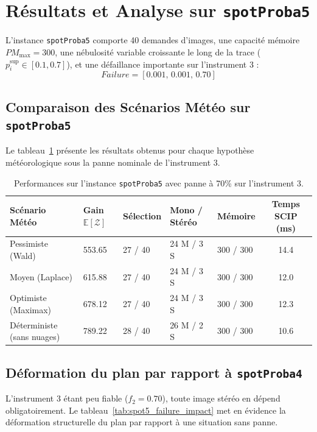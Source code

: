 \section{Résultats et Analyse sur \texttt{spotProba5}}

L'instance \texttt{spotProba5} comporte 40 demandes d'images, une capacité mémoire $PM_{\max} = 300$, une nébulosité variable croissante le long de la trace ($p_i^{\sup} \in [0.1, 0.7]$), et une défaillance importante sur l'instrument 3 :
\begin{equation}
    Failure = [0.001, \, 0.001, \, 0.70]
\end{equation}

\subsection{Comparaison des Scénarios Météo sur \texttt{spotProba5}}
Le tableau~\ref{tab:spot5_comparaison} présente les résultats obtenus pour chaque hypothèse météorologique sous la panne nominale de l'instrument 3.

\begin{table}[H]
\centering
\small
\begin{tabularx}{\textwidth}{lXXXXc}
\toprule
\textbf{Scénario Météo} & \textbf{Gain $\mathbb{E}[\mathcal{Z}]$} & \textbf{Sélection} & \textbf{Mono / Stéréo} & \textbf{Mémoire} & \textbf{Temps SCIP (ms)} \\
\midrule
Pessimiste (Wald) & 553.65 & 27 / 40 & 24 M / 3 S & 300 / 300 & 14.4 \\
Moyen (Laplace) & 615.88 & 27 / 40 & 24 M / 3 S & 300 / 300 & 12.0 \\
Optimiste (Maximax) & 678.12 & 27 / 40 & 24 M / 3 S & 300 / 300 & 12.3 \\
Déterministe (sans nuages) & 789.22 & 28 / 40 & 26 M / 2 S & 300 / 300 & 10.6 \\
\bottomrule
\end{tabularx}
\caption{Performances sur l'instance \texttt{spotProba5} avec panne à 70\% sur l'instrument 3.}
\label{tab:spot5_comparaison}
\end{table}

\subsection{Déformation du plan par rapport à \texttt{spotProba4}}
L'instrument 3 étant peu fiable ($f_2=0.70$), toute image stéréo en dépend obligatoirement. Le tableau~\ref{tab:spot5_failure_impact} met en évidence la déformation structurelle du plan par rapport à une situation sans panne.

